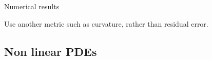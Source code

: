 \begin{frame}{Numerical results}
\begin{minipage}{0.86\linewidth}
        \vspace{5pt}
        Use another metric such as curvature, rather than residual error.

    \end{minipage}


\end{frame}

\subsection{\filledstar Non linear PDEs}

